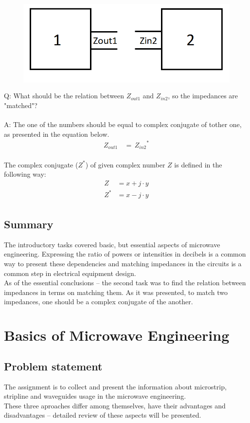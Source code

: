 \documentclass[eng,printmode]{mgr}
\begin{document}
\begin{figure}[h]
	\centering
	\includegraphics[width=0.3\linewidth]{matching}
	\label{fig:matching}
\end{figure}
\noindent
Q: What should be the relation between $Z_{out1}$ and $Z_{in2}$, so the impedances are "matched"?
\\
\\
A: The one of the numbers should be equal to complex conjugate of tother one, as presented in the equation below.
\begin{align*}
Z_{out1}\, &= \, {Z_{in2}}^*
\end{align*}
\\
The complex conjugate ($Z^*$) of given complex number $Z$ is defined in the following way:
\begin{align*}
Z &= x + j\cdot y \\
Z^* &= x - j\cdot y \\
\end{align*}
\section{Summary}
The introductory tasks covered basic, but essential aspects of microwave engineering. Expressing the ratio of powers or intensities in decibels is a common way to present these dependencies and matching impedances in the circuits is a common step in electrical equipment design.\\
As of the essential conclusions -- the second task was to find the relation between impedances in terms on matching them. As it was presented, to match two impedances, one should be a complex conjugate of the another.
\newpage
\chapter{Basics of Microwave Engineering}
\section{Problem statement}
The assignment is to collect and present the information about microstrip, stripline and waveguides usage in the microwave engineering.\\
These three aproaches differ among themselves, have their advantages and disadvantages -- detailed review of these aspects will be presented.
\end{document}

